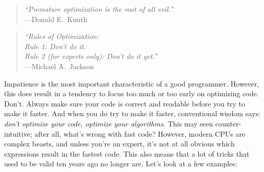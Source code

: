\label{chap:Optimization}

\begin{quote}\small
\emph{``Premature optimization is the root of all evil.''} \\ \hspace*{\fill}---Donald E.\ Knuth
\end{quote}
\begin{quote}\small
\emph{``Rules of Optimization: \\ Rule 1: Don't do it. \\ Rule 2 (for experts only): Don't do it yet.''} \\ \hspace*{\fill}---Michael A.\ Jackson
\end{quote}
Impatience is the most important characteristic of a good programmer.
However, this does result in a tendency to focus too much or too early on optimizing code. Don't.
Always make sure your code is correct and readable before you try to make it faster.
And when you do try to make it faster, conventional wisdom says: \emph{don't optimize your code, optimize your algorithms.}
This may seen counter-intuitive; after all, what's wrong with fast code?
However, modern CPUs are complex beasts, and unless you're an expert, it's not at all obvious which expressions result in the fastest code.
This also means that a lot of tricks that used to be valid ten years ago no longer are.
Let's look at a few examples:
